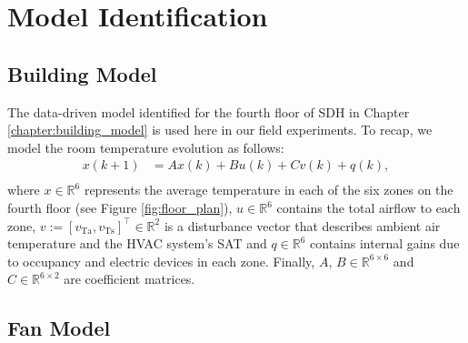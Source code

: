 %
%


\section{Model Identification}\label{sec:model_id}

\subsection{Building Model}
The data-driven model identified for the fourth floor of SDH in Chapter \ref{chapter:building_model} is used here in our field experiments.
To recap, we model the room temperature evolution as follows:
\begin{equation}
\begin{aligned}\label{eq:building_model}
x(k+1) &= A x(k) + B u(k) + C v(k) + q(k), \\
\end{aligned}
\end{equation}
where $x \in \mathbb{R}^6$ represents the average temperature in each of the six zones on the fourth floor (see Figure \ref{fig:floor_plan}), $u \in \mathbb{R}^6$ contains the total airflow to each zone, $v:= \left[ v_\text{Ta}, v_\text{Ts} \right]^\top \in \mathbb{R}^2$ is a disturbance vector that describes ambient air temperature and the HVAC system's SAT and  $q \in \mathbb{R}^6$ contains internal gains due to occupancy and electric devices in each zone.
Finally, $A$, $B \in \mathbb{R}^{6\times6}$ and $C \in \mathbb{R}^{6\times2}$ are coefficient matrices.




\subsection{Fan Model}

